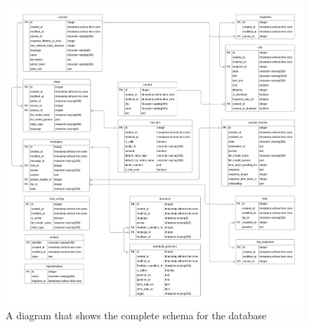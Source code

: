 
\begin{figure}[H]
    \centering
    \includegraphics[width=\textwidth]{content/figures/assets/12-database-diagram.pdf}
    \caption{A diagram that shows the complete schema for the database}
    \label{fig:database_schema}
\end{figure}

